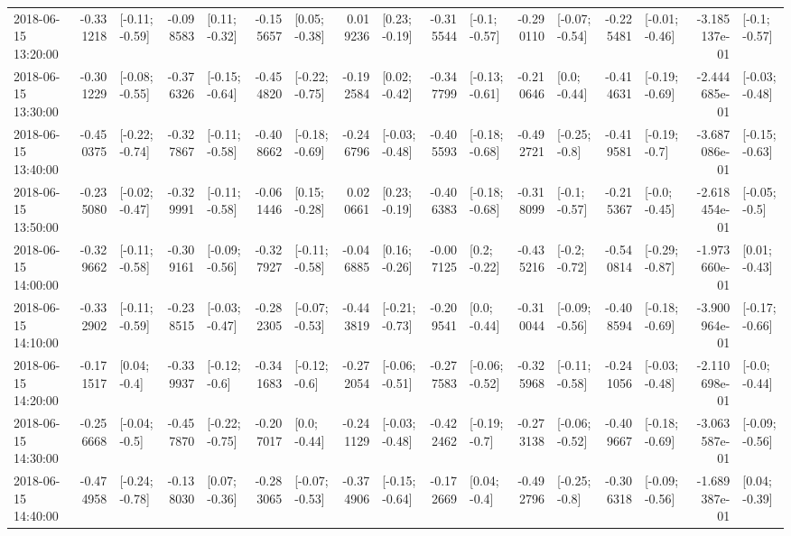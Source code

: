 \begin{tabular}{lrlrlrlrlrlrlrlrl}
2018-06-15 13:20:00 & -0.331218 &  [-0.11; -0.59] & -0.098583 &   [0.11; -0.32] & -0.155657 &   [0.05; -0.38] &  0.019236 &   [0.23; -0.19] & -0.315544 &   [-0.1; -0.57] & -0.290110 &  [-0.07; -0.54] & -0.225481 &  [-0.01; -0.46] & -3.185137e-01 &   [-0.1; -0.57] \\
2018-06-15 13:30:00 & -0.301229 &  [-0.08; -0.55] & -0.376326 &  [-0.15; -0.64] & -0.454820 &  [-0.22; -0.75] & -0.192584 &   [0.02; -0.42] & -0.347799 &  [-0.13; -0.61] & -0.210646 &    [0.0; -0.44] & -0.414631 &  [-0.19; -0.69] & -2.444685e-01 &  [-0.03; -0.48] \\
2018-06-15 13:40:00 & -0.450375 &  [-0.22; -0.74] & -0.327867 &  [-0.11; -0.58] & -0.408662 &  [-0.18; -0.69] & -0.246796 &  [-0.03; -0.48] & -0.405593 &  [-0.18; -0.68] & -0.492721 &   [-0.25; -0.8] & -0.419581 &   [-0.19; -0.7] & -3.687086e-01 &  [-0.15; -0.63] \\
2018-06-15 13:50:00 & -0.235080 &  [-0.02; -0.47] & -0.329991 &  [-0.11; -0.58] & -0.061446 &   [0.15; -0.28] &  0.020661 &   [0.23; -0.19] & -0.406383 &  [-0.18; -0.68] & -0.318099 &   [-0.1; -0.57] & -0.215367 &   [-0.0; -0.45] & -2.618454e-01 &   [-0.05; -0.5] \\
2018-06-15 14:00:00 & -0.329662 &  [-0.11; -0.58] & -0.309161 &  [-0.09; -0.56] & -0.327927 &  [-0.11; -0.58] & -0.046885 &   [0.16; -0.26] & -0.007125 &    [0.2; -0.22] & -0.435216 &   [-0.2; -0.72] & -0.540814 &  [-0.29; -0.87] & -1.973660e-01 &   [0.01; -0.43] \\
2018-06-15 14:10:00 & -0.332902 &  [-0.11; -0.59] & -0.238515 &  [-0.03; -0.47] & -0.282305 &  [-0.07; -0.53] & -0.443819 &  [-0.21; -0.73] & -0.209541 &    [0.0; -0.44] & -0.310044 &  [-0.09; -0.56] & -0.408594 &  [-0.18; -0.69] & -3.900964e-01 &  [-0.17; -0.66] \\
2018-06-15 14:20:00 & -0.171517 &    [0.04; -0.4] & -0.339937 &   [-0.12; -0.6] & -0.341683 &   [-0.12; -0.6] & -0.272054 &  [-0.06; -0.51] & -0.277583 &  [-0.06; -0.52] & -0.325968 &  [-0.11; -0.58] & -0.241056 &  [-0.03; -0.48] & -2.110698e-01 &   [-0.0; -0.44] \\
2018-06-15 14:30:00 & -0.256668 &   [-0.04; -0.5] & -0.457870 &  [-0.22; -0.75] & -0.207017 &    [0.0; -0.44] & -0.241129 &  [-0.03; -0.48] & -0.422462 &   [-0.19; -0.7] & -0.273138 &  [-0.06; -0.52] & -0.409667 &  [-0.18; -0.69] & -3.063587e-01 &  [-0.09; -0.56] \\
2018-06-15 14:40:00 & -0.474958 &  [-0.24; -0.78] & -0.138030 &   [0.07; -0.36] & -0.283065 &  [-0.07; -0.53] & -0.374906 &  [-0.15; -0.64] & -0.172669 &    [0.04; -0.4] & -0.492796 &   [-0.25; -0.8] & -0.306318 &  [-0.09; -0.56] & -1.689387e-01 &   [0.04; -0.39] \\

\end{tabular}
